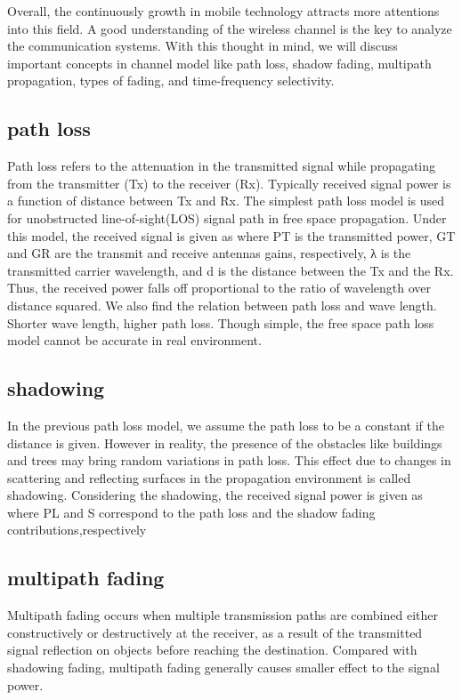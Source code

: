 Overall, the continuously growth in mobile technology attracts more attentions into this field. A good understanding of the wireless channel is the key to analyze the communication systems. With this thought in mind, we will discuss important concepts in channel model like path loss, shadow fading, multipath propagation, types of fading, and time-frequency selectivity.
\subsection{path loss}
Path loss refers to the attenuation in the transmitted signal while propagating from the transmitter (Tx) to the receiver (Rx). Typically received signal power is a function of distance between Tx and Rx. The simplest path loss model is used for unobstructed line-of-sight(LOS) signal path in free space propagation. Under this model, the received signal is given as
where PT is the transmitted power, GT and GR are the transmit and receive antennas gains, respectively, λ is the transmitted carrier wavelength, and d is the distance between the Tx and the Rx. Thus, the received power falls off proportional to the ratio of wavelength over distance squared. We also find the relation between path loss and wave length. Shorter wave length, higher path loss.
Though simple, the free space path loss model cannot be accurate in real environment. 
\subsection{shadowing}
In the previous path loss model, we assume the path loss to be a constant if the distance is given. However in reality, the presence of the obstacles like buildings and trees may bring random variations in path loss. This effect due to changes in scattering and reflecting surfaces in the propagation environment is called shadowing. Considering the shadowing, the received signal power is given as
where PL and S correspond to the path loss and the shadow fading contributions,respectively
\subsection{multipath fading}
Multipath fading occurs when multiple transmission paths are combined
either constructively or destructively at the receiver, as a result of the transmitted
signal reflection on objects before reaching the destination. Compared with shadowing fading, multipath fading generally causes smaller effect to the signal power.

